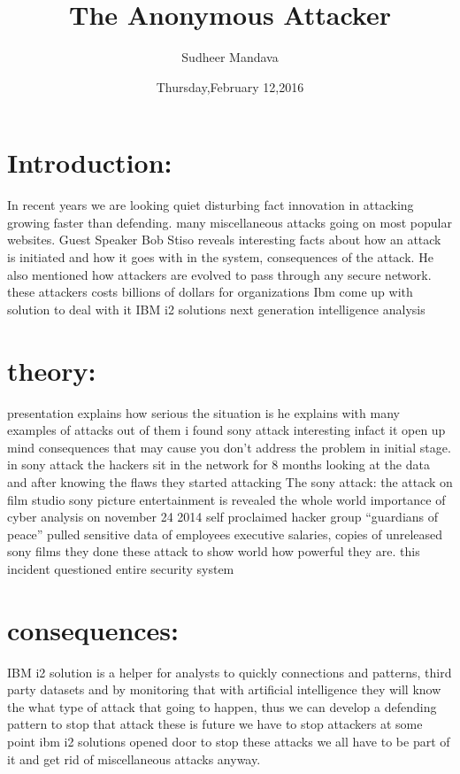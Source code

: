 \documentclass{article}
\title{ The Anonymous Attacker}
\author{Sudheer Mandava}
\date{Thursday,February 12,2016}
\begin{document}
\maketitle

                    

   \section{Introduction:} In recent years we are looking quiet disturbing fact innovation in attacking growing faster than defending. many miscellaneous attacks going on most popular websites. Guest Speaker Bob Stiso reveals interesting facts about how an attack is initiated and how it goes with in the system, consequences of the attack. He also mentioned how attackers are evolved to pass through any secure network. these attackers costs billions of dollars for organizations Ibm come up with solution to deal with it IBM i2 solutions next generation intelligence analysis\\
\section{theory:}
presentation explains how serious the situation is he explains with many examples of attacks
out of them i found sony attack interesting infact it open up mind consequences that may cause  you don't address the  problem in initial stage. in sony attack the hackers sit in the network for 8 months looking at the data and after knowing the flaws they started attacking The sony attack:  the attack on film studio sony picture entertainment is revealed the whole world importance of cyber analysis on november 24 2014 self proclaimed hacker group “guardians of peace” pulled sensitive data of employees executive salaries, copies of unreleased sony films  they done these attack to show world how powerful they are. this incident questioned entire security system \\
\section{consequences:}
IBM i2 solution is a helper for analysts to quickly connections and patterns, third party datasets and by monitoring that with artificial intelligence they will know the what type of attack that going to happen, thus we can develop a defending pattern to stop that attack  these is future we have to stop attackers at some point ibm i2 solutions opened door to stop these attacks we all have to be part of it and get rid of miscellaneous attacks anyway.\\
\end{document}
